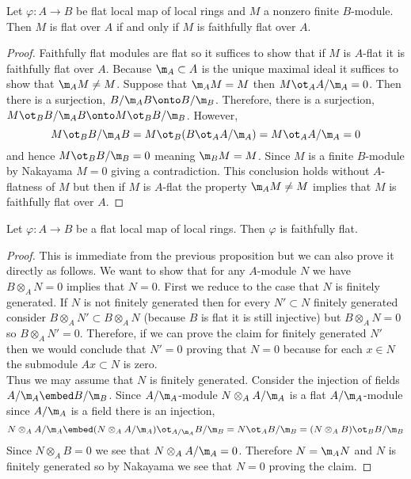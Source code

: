 \documentclass[12pt]{article}
\begin{document}
\begin{prop}
Let $\varphi : A \to B$ be flat local map of local rings and $M$ a nonzero finite $B$-module. Then $M$ is flat over $A$ if and only if $M$ is faithfully flat over $A$. 
\end{prop}

\begin{proof}
Faithfully flat modules are flat so it suffices to show that if $M$ is $A$-flat it is faithfully flat over $A$. Because $\m_A \subset A$ is the unique maximal ideal it suffices to show that $\m_A M \neq M$. Suppose that $\m_A M = M$ then $M \ot_A A / \m_A = 0$. Then there is a surjection, $B / \m_A B \onto B / \m_B$. Therefore, there is a surjection, $M \ot_B B / \m_A B \onto M \ot_B B / \m_B$. However, 
\[ M \ot_B B / \m_A B = M \ot_B (B \ot_A A / \m_A) = M \ot_A A / \m_A = 0 \]
and hence $M \ot_B B / \m_B = 0$ meaning $\m_B M = M$. Since $M$ is a finite $B$-module by Nakayama $M = 0$ giving a contradiction. This conclusion holds without $A$-flatness of $M$ but then if $M$ is $A$-flat the property $\m_A M \neq M$ implies that $M$ is faithfully flat over $A$.
\end{proof}

\begin{cor}
Let $\varphi : A \to B$ be a flat local map of local rings. Then $\varphi$ is faithfully flat.
\end{cor}

\begin{proof}
This is immediate from the previous proposition but we can also prove it directly as follows.
We want to show that for any $A$-module $N$ we have $B \otimes_A N = 0$ implies that $N = 0$. First we reduce to the case that $N$ is finitely generated.
If $N$ is not finitely generated then for every $N' \subset N$ finitely generated consider $B \otimes_A N' \subset B \otimes_A N$ (because $B$ is flat it is still injective) but $B \otimes_A N = 0$ so $B \otimes_A N' = 0$. Therefore, if we can prove the claim for finitely generated $N'$ then we would conclude that $N' = 0$ proving that $N = 0$ because for each $x \in N$ the submodule $A x \subset N$ is zero. 
\bigskip\\
Thus we may assume that $N$ is finitely generated. Consider the injection of fields $A / \m_A \embed B / \m_B$. Since $A/ \m_A$-module $N \otimes_A A / \m_A$ is a flat $A / \m_A$-module since $A / \m_A$ is a field there is an injection,
\[ N \otimes_A A / \m_A \embed (N \otimes_A A / \m_A) \ot_{A / \m_A} B / \m_B = N \ot_A B / \m_B = (N \otimes_A B) \ot_B B / \m_B \]
Since $N \otimes_A B = 0$ we see that $N \otimes_A A / \m_A = 0$. Therefore $N = \m_A N$ and $N$ is finitely generated so by Nakayama we see that $N = 0$ proving the claim.
\end{proof}
\end{document}
